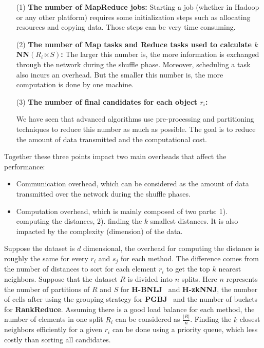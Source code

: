 \documentclass[10pt,journal,compsoc]{IEEEtran}
\newcommand{\Z}{{\bf H-zkNNJ}}
\newcommand{\LSH}{{\bf RankReduce}}
\newcommand{\VO}{{\bf PGBJ}}
\newcommand{\HBNLJ}{{\bf H-BNLJ}}
\begin{document}
\begin{itemize}
\item[(1)] \textbf{The number of MapReduce jobs:} Starting a job (whether in 
Hadoop\cite{Jiang:2010:PMI:1920841.1920903} or any other platform) requires some initialization steps 
such as allocating resources and copying data. Those steps can be very time 
consuming.
\item[(2)] \textbf{The number of Map tasks and Reduce tasks used to calculate $k$NN$\left(R_i \ltimes S\right)$:} The 
larger this number is, the more 
information is exchanged through the network during the shuffle phase. 
Moreover, scheduling a task also incurs an overhead. But the smaller this number is, the more computation is done by 
one machine.
\item[(3)] \textbf{The number of final candidates for each object $r_i$:
} %

We have seen that advanced algorithms use pre-processing and partitioning techniques to reduce this number as much as possible. The goal
is to reduce the amount of data transmitted and the computational cost. 


\end{itemize} 

 

Together these three points impact two main overheads that affect the performance:
\begin{itemize}
\item Communication overhead, which can be considered as the amount of data transmitted over the network during the 
shuffle phases. 

\item Computation overhead, which %
is mainly composed of two parts: 1). computing the distances, 2). finding the $k$ smallest distances. It is also 
impacted by the complexity (dimension) of the data.
\end{itemize}

 

Suppose the dataset is $d$ dimensional, the overhead for computing the distance is roughly the same for every $r_i$ and 
$s_j$ for each method. The difference comes from the number of distances to 
sort for each element $r_i$ to get the top $k$ nearest neighbors. Suppose that the dataset $R$ is divided into $n$ splits. 
Here $n$ represents the number of partitions of $R$ and $S$ for \HBNLJ~ and \Z, the number of cells after using the 
grouping strategy for \VO~ and the number of buckets for \LSH. %
Assuming there is a good load balance for each method, the number of elements in one split $R_i$ can be 
considered as $\frac{\left|R\right|}{n}$. Finding the $k$ closest neighbors efficiently for a given $r_i$ can be done using 
a priority queue, which less costly than sorting all candidates.
\end{document}
